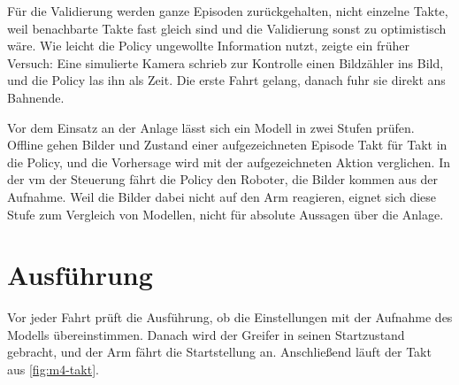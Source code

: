Für die Validierung werden ganze Episoden zurückgehalten, nicht einzelne Takte, weil benachbarte
Takte fast gleich sind und die Validierung sonst zu optimistisch wäre. Wie leicht die Policy
ungewollte Information nutzt, zeigte ein früher Versuch: Eine simulierte Kamera schrieb zur
Kontrolle einen Bildzähler ins Bild, und die Policy las ihn als Zeit. Die erste Fahrt gelang,
danach fuhr sie direkt ans Bahnende.

Vor dem Einsatz an der Anlage lässt sich ein Modell in zwei Stufen prüfen. Offline gehen Bilder
und Zustand einer aufgezeichneten Episode Takt für Takt in die Policy, und die Vorhersage wird mit
der aufgezeichneten Aktion verglichen. In der \ac{vm} der Steuerung fährt die Policy den Roboter,
die Bilder kommen aus der Aufnahme. Weil die Bilder dabei nicht auf den Arm reagieren, eignet
sich diese Stufe zum Vergleich von Modellen, nicht für absolute Aussagen über die Anlage.

\section{Ausführung}
\label{sec:m4-inferenz}

Vor jeder Fahrt prüft die Ausführung, ob die Einstellungen mit der Aufnahme des Modells
übereinstimmen. Danach wird der Greifer in seinen Startzustand gebracht, und der Arm fährt die
Startstellung an. Anschließend läuft der Takt aus \cref{fig:m4-takt}.

